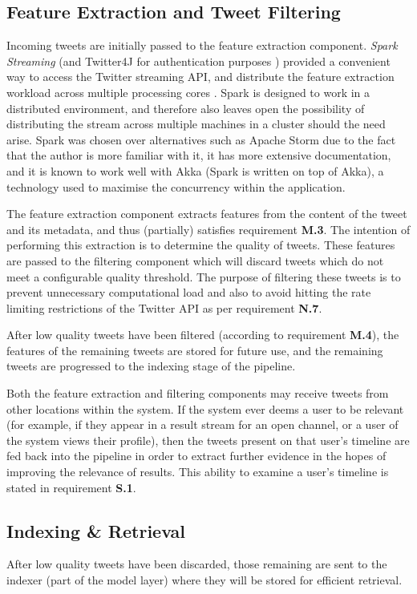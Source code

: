 \documentclass{l4proj}
\begin{document}
    \subsection{Feature Extraction and Tweet Filtering}
        Incoming tweets are initially passed to the feature extraction component. \textit{Spark Streaming} (and Twitter4J for authentication purposes \cite{twitter4j}) provided a convenient way to access the Twitter streaming API, and distribute the feature extraction workload across multiple processing cores \cite{sparkstreaming}. Spark is designed to work in a distributed environment, and therefore also leaves open the possibility of distributing the stream across multiple machines in a cluster should the need arise. Spark was chosen over alternatives such as Apache Storm due to the fact that the author is more familiar with it, it has more extensive documentation, and it is known to work well with Akka (Spark is written on top of Akka), a technology used to maximise the concurrency within the application.
        
        The feature extraction component extracts features from the content of the tweet and its metadata, and thus (partially) satisfies requirement \textbf{M.3}. The intention of performing this extraction is to determine the quality of tweets. These features are passed to the filtering component which will discard tweets which do not meet a configurable quality threshold. The purpose of filtering these tweets is to prevent unnecessary computational load and also to avoid hitting the rate limiting restrictions of the Twitter API as per requirement \textbf{N.7}.
        
        After low quality tweets have been filtered (according to requirement \textbf{M.4}), the features of the remaining tweets are stored for future use, and the remaining tweets are progressed to the indexing stage of the pipeline.

Both the feature extraction and filtering components may receive tweets from other locations within the system. If the system ever deems a user to be relevant (for example, if they appear in a result stream for an open channel, or a user of the system views their profile), then the tweets present on that user’s timeline are fed back into the pipeline in order to extract further evidence in the hopes of improving the relevance of results. This ability to examine a user's timeline is stated in requirement \textbf{S.1}.

        \subsection{Indexing \& Retrieval}
        After low quality tweets have been discarded, those remaining are sent to the indexer (part of the model layer) where they will be stored for efficient retrieval. 
        
\end{document}
